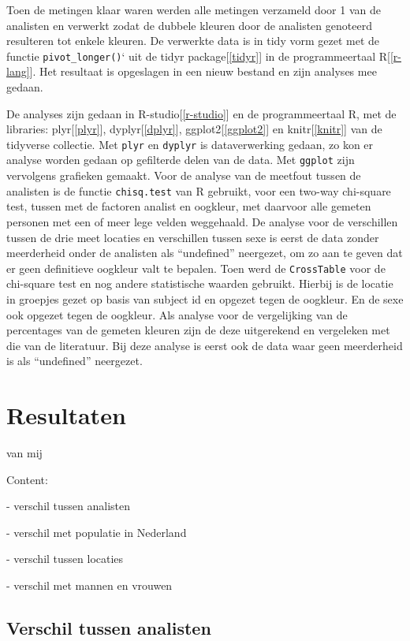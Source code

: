 \documentclass[
]{article}
\begin{document}
Toen de metingen klaar waren werden alle metingen verzameld door 1 van
de analisten en verwerkt zodat de dubbele kleuren door de analisten
genoteerd resulteren tot enkele kleuren. De verwerkte data is in tidy
vorm gezet met de functie \texttt{pivot\_longer()}` uit de tidyr
package{[}\ref{tidyr}{]} in de programmeertaal R{[}\ref{r-lang}{]}. Het
resultaat is opgeslagen in een nieuw bestand en zijn analyses mee
gedaan.

De analyses zijn gedaan in R-studio{[}\ref{r-studio}{]} en de
programmeertaal R, met de libraries: plyr{[}\ref{plyr}{]},
dyplyr{[}\ref{dplyr}{]}, ggplot2{[}\ref{ggplot2}{]} en knitr{[}\ref{knitr}{]} van
de tidyverse collectie. Met \texttt{plyr} en \texttt{dyplyr} is dataverwerking gedaan,
zo kon er analyse worden gedaan op gefilterde delen van de data. Met
\texttt{ggplot} zijn vervolgens grafieken gemaakt. Voor de analyse van de
meetfout tussen de analisten is de functie \texttt{chisq.test} van R gebruikt,
voor een two-way chi-square test, tussen met de factoren analist en
oogkleur, met daarvoor alle gemeten personen met een of meer lege velden
weggehaald. De analyse voor de verschillen tussen de drie meet locaties
en verschillen tussen sexe is eerst de data zonder meerderheid onder de
analisten als ``undefined'' neergezet, om zo aan te geven dat er geen
definitieve oogkleur valt te bepalen. Toen werd de \texttt{CrossTable} voor de
chi-square test en nog andere statistische waarden gebruikt. Hierbij is
de locatie in groepjes gezet op basis van subject id en opgezet tegen de
oogkleur. En de sexe ook opgezet tegen de oogkleur. Als analyse voor de
vergelijking van de percentages van de gemeten kleuren zijn de deze
uitgerekend en vergeleken met die van de literatuur. Bij deze analyse is
eerst ook de data waar geen meerderheid is als ``undefined'' neergezet.

\hypertarget{resultaten}{%
\section{Resultaten}\label{resultaten}}

van mij

Content:

- verschil tussen analisten

- verschil met populatie in Nederland

- verschil tussen locaties

- verschil met mannen en vrouwen

\hypertarget{verschil-tussen-analisten}{%
\subsection{Verschil tussen analisten}\label{verschil-tussen-analisten}}
\end{document}
